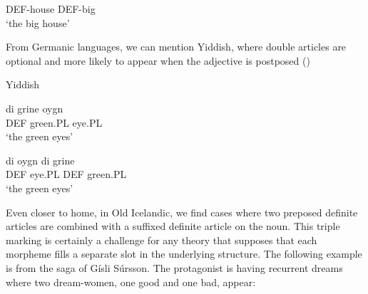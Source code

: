 DEF-house  DEF-big\\

\glt ‘the big house’

\z

From Germanic languages, we can mention Yiddish, where double articles are optional and more likely to appear when the adjective is postposed (\citet[342-347]{Plank2003})


\item 

Yiddish



\item 


 \ea\label{}
\gll di  grine  oygn\\


DEF  green.PL  eye.PL\\

\glt ‘the green eyes’

\z

\item 


 \ea\label{}
\gll di  oygn  di   grine\\


DEF  eye.PL  DEF  green.PL\\

\glt ‘the green eyes’

\z

Even closer to home, in Old Icelandic, we find cases where two preposed definite articles are combined with a suffixed definite article on the noun. This triple marking is certainly a challenge for any theory that supposes that each morpheme fills a separate slot in the underlying structure. The following example is from the saga of Gísli Súrsson. The protagonist is having recurrent dreams where two dream-women, one good and one bad, appear: 

